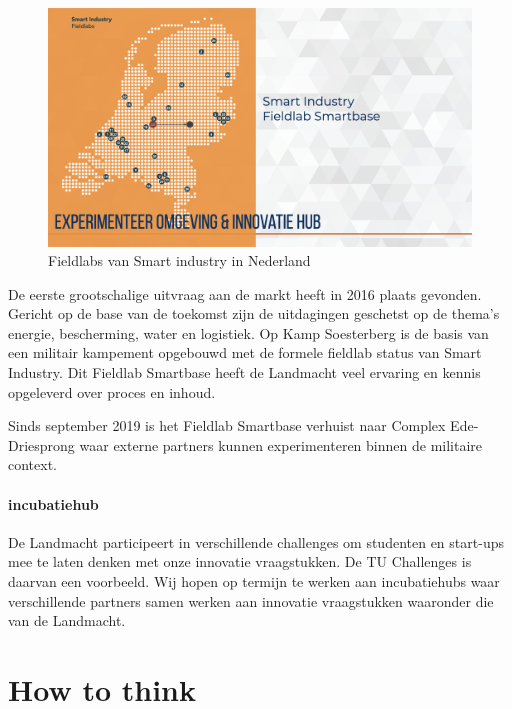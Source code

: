 \documentclass[
]{book}
\begin{document}
\begin{figure}
\includegraphics[width=26.67in]{data/keynote-slides/20200430-CDE-Designprocess/20200430-CDE-Designprocess.009-6} \caption{Fieldlabs van Smart industry in Nederland }\label{fig:unnamed-chunk-11}
\end{figure}

De eerste grootschalige uitvraag aan de markt heeft in 2016 plaats gevonden. Gericht op de base van de toekomst zijn de uitdagingen geschetst op de thema's energie, bescherming, water en logistiek. Op Kamp Soesterberg is de basis van een militair kampement opgebouwd met de formele fieldlab status van Smart Industry. Dit Fieldlab Smartbase heeft de Landmacht veel ervaring en kennis opgeleverd over proces en inhoud.

Sinds september 2019 is het Fieldlab Smartbase verhuist naar Complex Ede-Driesprong waar externe partners kunnen experimenteren binnen de militaire context.

\hypertarget{incubatiehub}{%
\subsubsection{incubatiehub}\label{incubatiehub}}

De Landmacht participeert in verschillende challenges om studenten en start-ups mee te laten denken met onze innovatie vraagstukken. De TU Challenges is daarvan een voorbeeld. Wij hopen op termijn te werken aan incubatiehubs waar verschillende partners samen werken aan innovatie vraagstukken waaronder die van de Landmacht.

\hypertarget{kort-cyclisch-moderniseren}{%
\chapter{How to think}\label{kort-cyclisch-moderniseren}}
\end{document}
